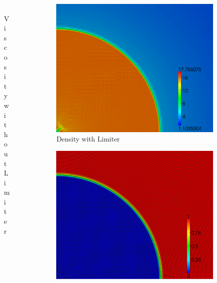\documentclass[8pt,xcolor=svgnames]{beamer}
\begin{document}
\begin{frame}
\begin{columns}
\begin{column}{0.3\textwidth}
\begin{figure}[t]
\begin{center}
\\Viscosity without Limiter
\end{center}
\end{figure}
\end{column}
\begin{column}{0.3\textwidth}
\begin{figure}[t]
\begin{center}
\includegraphics[height=0.9\textwidth]{figs/Noh/Q2l-7-density.png}
\\Density with Limiter
\end{center}
\end{figure}
\begin{figure}[t]
\begin{center}
\includegraphics[height=0.9\textwidth]{figs/Noh/Q2l-7-velocity.png}

\end{center}
\end{figure}
\end{column}
\end{columns}
\end{frame}
\end{document}
